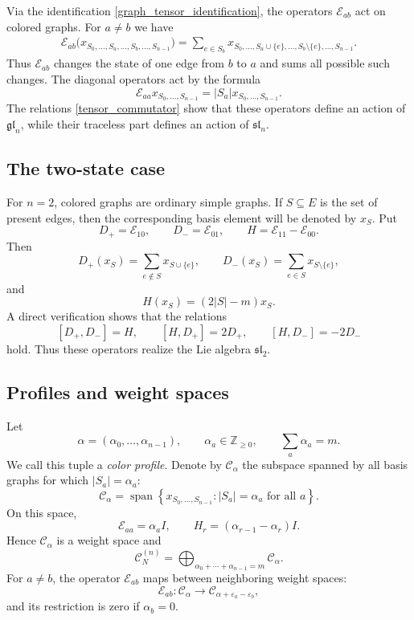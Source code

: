 \documentclass[12pt,reqno]{amsart}
\newcommand{\Span}{\operatorname{span}}
\begin{document}
Via the identification \eqref{graph_tensor_identification}, the operators
$\mathcal E_{ab}$ act on colored graphs. For $a\ne b$ we have
\begin{gather*}
\mathcal E_{ab}
\bigl(x_{S_0,\dots,S_a,\dots,S_b,\dots,S_{n-1}}\bigr)
=
\sum_{e\in S_b}
 x_{S_0,\dots,S_a\cup\{e\},\dots,S_b\setminus\{e\},\dots,S_{n-1}}.
\end{gather*}
Thus $\mathcal E_{ab}$ changes the state of one edge from $b$ to $a$ and
sums all possible such changes. The diagonal operators act by the formula
$$
\mathcal E_{aa}x_{S_0,\dots,S_{n-1}}
=
|S_a|x_{S_0,\dots,S_{n-1}}.
$$
The relations \eqref{tensor_commutator} show that these operators define
an action of $\mathfrak{gl}_n$, while their traceless part defines an
action of $\mathfrak{sl}_n$.

\subsection{The two-state case}

For $n=2$, colored graphs are ordinary simple graphs. If $S\subseteq E$
is the set of present edges, then the corresponding basis element will be
denoted by $x_S$. Put
$$
D_+=\mathcal E_{10},
\qquad
D_-=\mathcal E_{01},
\qquad
H=\mathcal E_{11}-\mathcal E_{00}.
$$
Then
$$
D_+(x_S)=\sum_{e\notin S}x_{S\cup\{e\}},
\qquad
D_-(x_S)=\sum_{e\in S}x_{S\setminus\{e\}},
$$
and
$$
H(x_S)=(2|S|-m)x_S.
$$
A direct verification shows that the relations
$$
[D_+,D_-]=H,
\qquad
[H,D_+]=2D_+,
\qquad
[H,D_-]=-2D_-
$$
hold. Thus these operators realize the Lie algebra $\mathfrak{sl}_2$.


\subsection{Profiles and weight spaces}

Let
$$
\alpha=(\alpha_0,\dots,\alpha_{n-1}),
\qquad
\alpha_a\in\mathbb Z_{\ge0},
\qquad
\sum_a\alpha_a=m.
$$
We call this tuple a \emph{color profile}. Denote by $\mathcal C_\alpha$
the subspace spanned by all basis graphs for which $|S_a|=\alpha_a$:
$$
\mathcal C_\alpha
=
\Span\left\{
 x_{S_0,\dots,S_{n-1}}:
 |S_a|=\alpha_a\text{ for all }a
\right\}.
$$
On this space,
$$
\mathcal E_{aa}=\alpha_aI,
\qquad
H_r=(\alpha_{r-1}-\alpha_r)I.
$$
Hence $\mathcal C_\alpha$ is a weight space and
$$
\mathcal C_N^{(n)}
=
\bigoplus_{\alpha_0+\cdots+\alpha_{n-1}=m}
\mathcal C_\alpha.
$$
For $a\ne b$, the operator $\mathcal E_{ab}$ maps between neighboring
weight spaces:
$$
\mathcal E_{ab}:\mathcal C_\alpha
\longrightarrow
\mathcal C_{\alpha+\varepsilon_a-\varepsilon_b},
$$
and its restriction is zero if $\alpha_b=0$.
\end{document}
